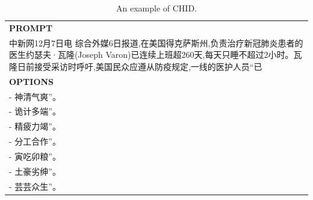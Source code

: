 \begin{table}[h]
    \centering \small
\begin{tabular}{p{12cm}}
\toprule
\textbf{PROMPT}\\
中新网12月7日电 综合外媒6日报道,在美国得克萨斯州,负责治疗新冠肺炎患者的医生约瑟夫·瓦隆(Joseph Varon)已连续上班超260天,每天只睡不超过2小时。瓦隆日前接受采访时呼吁,美国民众应遵从防疫规定,一线的医护人员“已\\
\midrule
\textbf{OPTIONS}\\
- 神清气爽”。\\
- 诡计多端”。\\
- 精疲力竭”。\\
- 分工合作”。\\
- 寅吃卯粮”。\\
- 土豪劣绅”。\\
- 芸芸众生”。\\
\bottomrule
\end{tabular}
    \caption{\centering An example of CHID.}
    \label{tab:chid_eval_format_example}
\end{table}

